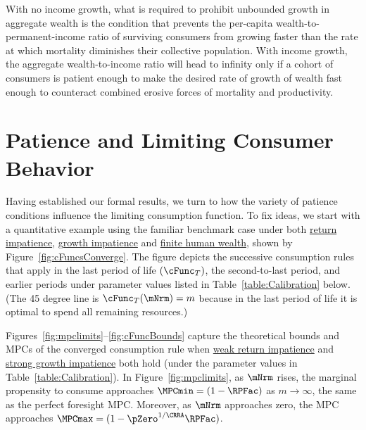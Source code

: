 \documentclass[BufferStockTheory]{subfiles}
\begin{document}
With no income growth, what is required to prohibit unbounded growth in aggregate wealth is the condition that prevents the per-capita wealth-to-permanent-income ratio of surviving consumers from growing faster than the rate at which mortality diminishes their collective population.  With income growth, the aggregate wealth-to-income ratio will head to infinity only if a cohort of consumers is patient enough to make the desired rate of growth of wealth fast enough to counteract combined erosive forces of mortality and productivity.

\hypertarget{Discussion-Growth-Impatience}{}
\section{Patience and Limiting Consumer Behavior}\label{sec:GICdiscussion}

\renewcommand{\figName}{cFuncsConverge} 
 

Having established our formal results, we turn to how the variety of patience conditions influence the limiting consumption function. To fix ideas, we start with a quantitative example using the familiar benchmark case under both \hyperlink{RIC}{return impatience}, \hyperlink{GIC}{growth impatience} and \hyperlink{FHWC}{finite human wealth}, shown by Figure~\ref{fig:cFuncsConverge}. The figure depicts the successive consumption rules that apply in the last period of life $(\cFunc_{T})$, the second-to-last period, and earlier periods under parameter values listed in Table~\ref{table:Calibration} below.  (The 45 degree line is $\cFunc_{T}(\mNrm) = m$ because in the last period of life it is optimal to spend all remaining resources.)

Figures~\ref{fig:mpclimits}--\ref{fig:cFuncBounds} capture the theoretical bounds and MPCs of the converged consumption rule when \hyperlink{RIC}{weak return impatience} and \hyperlink{GICMod}{strong growth impatience} both hold (under the parameter values in Table~\ref{table:Calibration}).  In Figure~\ref{fig:mpclimits}, as $\mNrm$ rises, the marginal propensity to consume approaches $\MPCmin=(1-\RPFac)$ as $m \rightarrow \infty$, the same as the perfect foresight MPC. Moreover, as $\mNrm$ approaches zero, the MPC approaches $\MPCmax=(1-\pZero^{1/\CRRA}\RPFac)$. 


\renewcommand{\figFile}{mpclimits}
\hypertarget{\figFile}{}

\renewcommand{\figFile}{cFuncBounds}
\hypertarget{\figFile}{}

\end{document}
